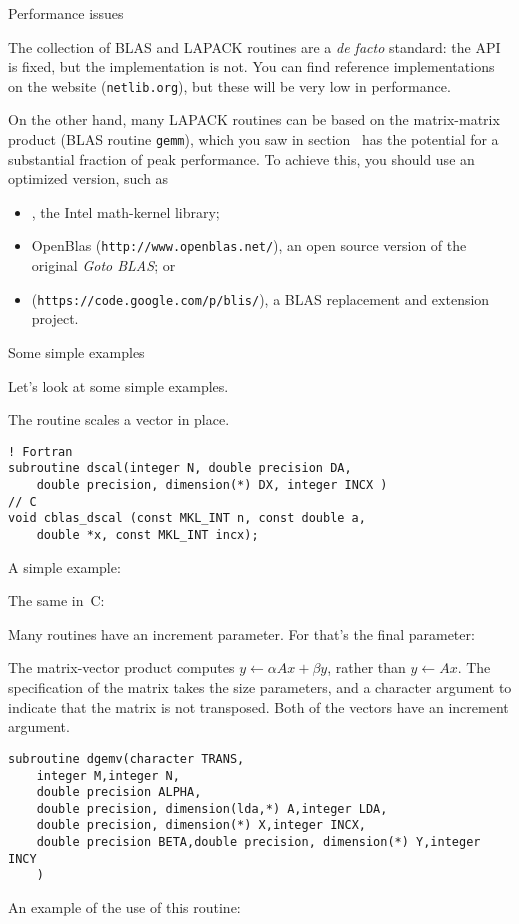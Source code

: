 
 {Performance issues}

The collection of BLAS and LAPACK routines are a \emph{de facto}
standard: the \ac{API} is fixed, but the implementation is not.
You can find reference implementations on the
 website (\texttt{netlib.org}), but
these will be very low in performance.

On the other hand, many LAPACK routines can be based on
the matrix-matrix product (BLAS routine \texttt{gemm}),
which you saw in section~ has the potential
for a substantial fraction of peak performance. To achieve
this, you should use an optimized version, such as
\begin{itemize}
\item {}, the Intel math-kernel library;
\item OpenBlas (\texttt{http://www.openblas.net/}), an open source
  version of the original \emph{Goto BLAS}; or
\item {} (\texttt{https://code.google.com/p/blis/}), a BLAS replacement and
  extension project.
\end{itemize}

 {Some simple examples}

Let's look at some simple examples.

The routine  scales a vector in place.
\lstset{language=Fortran}
\begin{lstlisting}
! Fortran
subroutine dscal(integer N, double precision DA,
    double precision, dimension(*) DX, integer INCX )  
// C
void cblas_dscal (const MKL_INT n, const double a, 
    double *x, const MKL_INT incx);
\end{lstlisting}
A simple example:
%

The same in~C:
%

Many routines have an increment parameter. For  that's the final parameter:
%

The matrix-vector product  computes $y\leftarrow \alpha Ax+\beta y$,
rather than $y\leftarrow Ax$.
The specification of the matrix takes the  size parameters,
and a character argument  to indicate that the matrix is not transposed.
Both of the vectors have an increment argument.
\lstset{language=Fortran}
\begin{lstlisting}
subroutine dgemv(character TRANS,
    integer M,integer N,
    double precision ALPHA,
    double precision, dimension(lda,*) A,integer LDA,
    double precision, dimension(*) X,integer INCX,
    double precision BETA,double precision, dimension(*) Y,integer INCY
    )
\end{lstlisting}
An example of the use of this routine:
%

